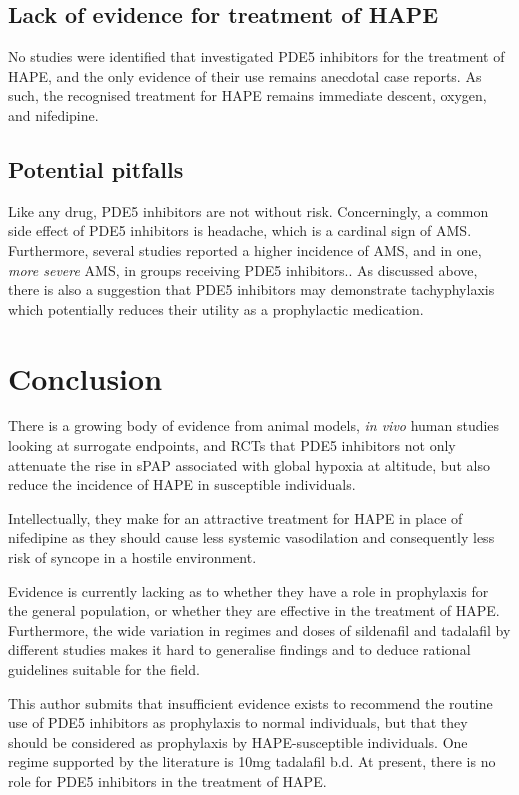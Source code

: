 \documentclass[12pt,a4paper]{article}
\begin{document}
\subsection*{Lack of evidence for treatment of HAPE}

No studies were identified that investigated PDE5 inhibitors for the treatment of HAPE, and the only evidence of their use remains anecdotal case reports. As such, the recognised treatment for HAPE remains immediate descent, oxygen, and nifedipine.

\subsection*{Potential pitfalls}

Like any drug, PDE5 inhibitors are not without risk. Concerningly, a common side effect of PDE5 inhibitors is headache, which is a cardinal sign of AMS. Furthermore, several studies reported a higher incidence of AMS, and in one, \emph{more severe} AMS, in groups receiving PDE5 inhibitors.\cite{Maggiorini:2006kz,Bates:2011du,Leshem:2012jq}. As discussed above, there is also a suggestion that PDE5 inhibitors may demonstrate tachyphylaxis which potentially reduces their utility as a prophylactic medication.\cite{Bates:2011du}

\section*{Conclusion}

There is a growing body of evidence from animal models, \emph{in vivo} human studies looking at surrogate endpoints, and RCTs that PDE5 inhibitors not only attenuate the rise in sPAP associated with global hypoxia at altitude, but also reduce the incidence of HAPE in susceptible individuals.

Intellectually, they make for an attractive treatment for HAPE in place of nifedipine as they should cause less systemic vasodilation and consequently less risk of syncope in a hostile environment.\cite{JointFormularyCommittee:2013tz}

Evidence is currently lacking as to whether they have a role in prophylaxis for the general population, or whether they are effective in the treatment of HAPE. Furthermore, the wide variation in regimes and doses of sildenafil and tadalafil by different studies makes it hard to generalise findings and to deduce rational guidelines suitable for the field.

This author submits that insufficient evidence exists to recommend the routine use of PDE5 inhibitors as prophylaxis to normal individuals, but that they should be considered as prophylaxis by HAPE-susceptible individuals. One regime supported by the literature is 10mg tadalafil b.d. At present, there is no role for PDE5 inhibitors in the treatment of HAPE.



\end{document}
